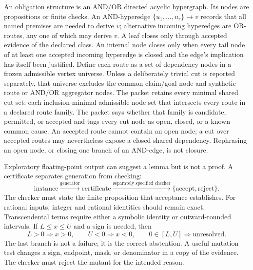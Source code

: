 \documentclass[11pt]{article}
\begin{document}
An obligation structure is an AND/OR directed acyclic hypergraph.  Its nodes are propositions or
finite checks.  An AND-hyperedge \(\{u_1,\ldots,u_r\}\to v\) records that all named premises are
needed to derive \(v\); alternative incoming hyperedges are OR-routes, any one of which may derive
\(v\).  A leaf closes only through accepted evidence of the declared class.  An internal node
closes only when every tail node of at least one accepted incoming hyperedge is closed and the
edge's implication has itself been justified.  Define each route as a set of dependency nodes in a
frozen admissible vertex universe.  Unless a deliberately trivial cut is reported separately, that
universe excludes the common claim/goal node and synthetic route or AND/OR aggregator nodes.  The
packet retains every minimal shared cut set: each inclusion-minimal admissible node set that
intersects every route in a declared route family.  The packet says whether that family is
candidate, permitted, or accepted and tags every
cut node as open, closed, or a known common cause.  An accepted route cannot contain an open node;
a cut over accepted routes may nevertheless expose a closed shared dependency.  Rephrasing an open
node, or closing one branch of an AND-edge, is not closure.


Exploratory floating-point output can suggest a lemma but is not a proof.  A certificate separates
generation from checking:
\[
  \text{instance}
  \xrightarrow{\text{generator}}
  \text{certificate}
  \xrightarrow{\text{separately specified checker}}
  \{\text{accept},\text{reject}\}.
\]
The checker must state the finite proposition that acceptance establishes.  For rational inputs,
integer and rational identities should remain exact.  Transcendental terms require either a
symbolic identity or outward-rounded intervals.  If \(L\le x\le U\) and a sign is needed, then
\[
  L>0\Longrightarrow x>0,\qquad
  U<0\Longrightarrow x<0,\qquad
  0\in[L,U]\Longrightarrow\text{unresolved}.
\]
The last branch is not a failure; it is the correct abstention.  A useful mutation test changes a
sign, endpoint, mask, or denominator in a copy of the evidence.  The checker must reject the
mutant for the intended reason.

\end{document}
